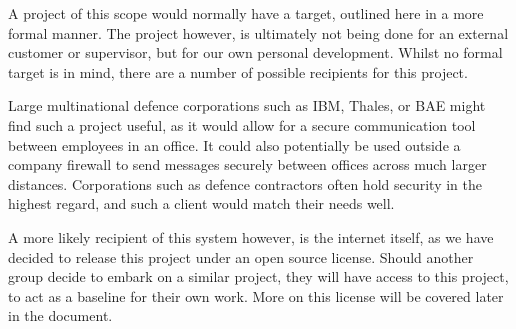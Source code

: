 A project of this scope would normally have a target, outlined here in a more
formal manner. The project however, is ultimately not being done for an external
customer or supervisor, but for our own personal development. Whilst no formal
target is in mind, there are a number of possible recipients for this project.

Large multinational defence corporations such as IBM, Thales, or BAE might find
such a project useful, as it would allow for a secure communication tool between
employees in an office. It could also potentially be used outside a company
firewall to send messages securely between offices across much larger distances.
Corporations such as defence contractors often hold security in the highest
regard, and such a client would match their needs well.

A more likely recipient of this system however, is the internet itself, as we
have decided to release this project under an open source license. Should
another group decide to embark on a similar project, they will have access to
this project, to act as a baseline for their own work. More on this license
will be covered later in the document.
